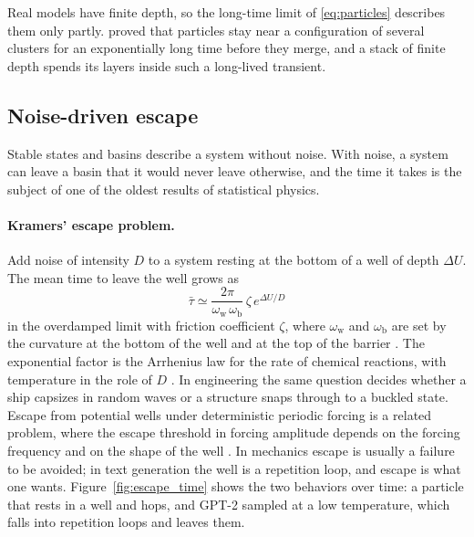 Real models have finite depth, so the long-time limit of \eqref{eq:particles} describes them only partly. \citet{geshkovski2024dynamic} proved that particles stay near a configuration of several clusters for an exponentially long time before they merge, and a stack of finite depth spends its layers inside such a long-lived transient.

\subsection{Noise-driven escape}
\label{sec:escape}
\label{sec:sgd}

Stable states and basins describe a system without noise. With noise, a system can leave a basin that it would never leave otherwise, and the time it takes is the subject of one of the oldest results of statistical physics.

\paragraph{Kramers' escape problem.} Add noise of intensity $D$ to a system resting at the bottom of a well of depth $\Delta U$. The mean time to leave the well grows as
\begin{equation}
\bar\tau\simeq\frac{2\pi}{\omega_{\mathrm{w}}\,\omega_{\mathrm{b}}}\,\zeta\,e^{\Delta U/D}
\label{eq:kramers}
\end{equation}
in the overdamped limit with friction coefficient $\zeta$, where $\omega_{\mathrm{w}}$ and $\omega_{\mathrm{b}}$ are set by the curvature at the bottom of the well and at the top of the barrier \citep{kramers1940brownian,hanggi1990reaction}. The exponential factor is the Arrhenius law for the rate of chemical reactions, with temperature in the role of $D$ \citep{arrhenius1889reaktionsgeschwindigkeit}. In engineering the same question decides whether a ship capsizes in random waves or a structure snaps through to a buckled state. Escape from potential wells under deterministic periodic forcing is a related problem, where the escape threshold in forcing amplitude depends on the forcing frequency and on the shape of the well \citep{farid2019escape,farid2022escape}. In mechanics escape is usually a failure to be avoided; in text generation the well is a repetition loop, and escape is what one wants. Figure~\ref{fig:escape_time} shows the two behaviors over time: a particle that rests in a well and hops, and GPT-2 sampled at a low temperature, which falls into repetition loops and leaves them.

